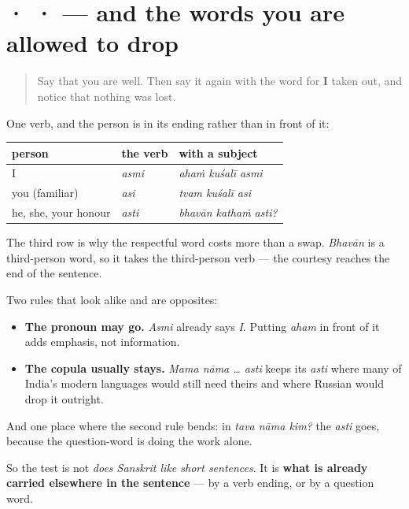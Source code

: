\section[\texorpdfstring{\sk{अहं} \sk{कुशली} \sk{अस्मि} (ahaṁ kuśalī asmi)}{अहं कुशली अस्मि (ahaṁ kuśalī asmi)}]{ ·  ·  — and the words you are allowed to drop}

\label{lesson:SA-R12-second-pass-what-sanskrit-leaves-out}



\begin{quote}
Say that you are well. Then say it again with the word for \textbf{I} taken out, and notice that nothing was lost.
\end{quote}

\begin{grammarlens}[title={Grammar Lens: one verb, three shapes}]
One verb, and the person is in its ending rather than in front of it:

\noindent
\begin{tabularx}{\linewidth}{@{}>{\raggedright\arraybackslash}X>{\raggedright\arraybackslash}X>{\raggedright\arraybackslash}X@{}}
\toprule
\textbf{person} & \textbf{the verb} & \textbf{with a subject} \\
\midrule
I & \textbf{\sk{अस्मि}} \emph{asmi} & \emph{ahaṁ kuśalī asmi} \\
you (familiar) & \textbf{\sk{असि}} \emph{asi} & \emph{tvam kuśalī asi} \\
he, she, your honour & \textbf{\sk{अस्ति}} \emph{asti} & \emph{bhavān kathaṁ asti?} \\
\bottomrule
\end{tabularx}

The third row is why the respectful word costs more than a swap. \emph{Bhavān} is a third-person word, so it takes the third-person verb — the courtesy reaches the end of the sentence.
\end{grammarlens}

\begin{culture}
Two rules that look alike and are opposites:

\begin{itemize}
\raggedright
  \item \textbf{The pronoun may go.} \emph{Asmi} already says \emph{I}. Putting \emph{aham} in front of it adds emphasis, not information.
  \item \textbf{The copula usually stays.} \emph{Mama nāma … asti} keeps its \emph{asti} where many of India's modern languages would still need theirs and where Russian would drop it outright.
\end{itemize}

And one place where the second rule bends: in \emph{tava nāma kim?} the \emph{asti} goes, because the question-word is doing the work alone.

So the test is not \emph{does Sanskrit like short sentences}. It is \textbf{what is already carried elsewhere in the sentence} — by a verb ending, or by a question word.
\end{culture}

